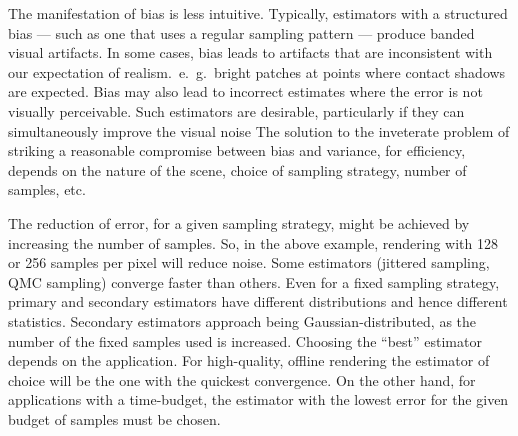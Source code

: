 The manifestation of bias is less intuitive. Typically, estimators with a structured bias --- such as one that uses a regular sampling pattern --- produce banded visual artifacts. In some cases, bias leads to artifacts that are inconsistent with our expectation of realism.~e.~g.~bright patches at points where contact shadows are expected. Bias may also lead to incorrect estimates where the error is not visually perceivable. Such estimators are desirable, particularly if they can simultaneously improve the visual noise The solution to the inveterate problem of striking a reasonable compromise between bias and variance, for efficiency, depends on the nature of the scene, choice of sampling strategy, number of samples, etc. 

The reduction of error, for a given sampling strategy, might be achieved by increasing the number of samples. So, in the above example, rendering with 128 or 256 samples per pixel will reduce noise. 
Some estimators (jittered sampling, QMC sampling) converge faster than others. Even for a fixed sampling strategy, primary and secondary estimators have different distributions and hence different statistics. Secondary estimators approach being Gaussian-distributed, as the number of the fixed samples used is increased. Choosing the ``best'' estimator depends on the application. For high-quality, offline rendering the estimator of choice will be the one with the quickest convergence. On the other hand, for applications with a time-budget, the estimator with the lowest error for the given budget of samples must be chosen.



